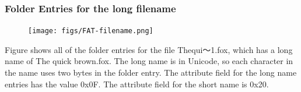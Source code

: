 % 
\begin{frame}[fragile]
    \frametitle{Folder Entries for the long filename}
\begin{figure}
    \texttt{[image: figs/FAT-filename.png]}
    \end{figure} \pause

    Figure shows all of the folder entries for the file {\color{red}Thequi～1.fox}, which has a long name of {\color{red}The quick brown.fox}. The long name is in Unicode, so each character in the name uses two bytes in the folder entry. The {\color{red}attribute field} for the long name entries has the value {\color{red}0x0F}. The attribute field for the short name is {\color{red}0x20}.
\end{frame}

\fi
% 
% 

